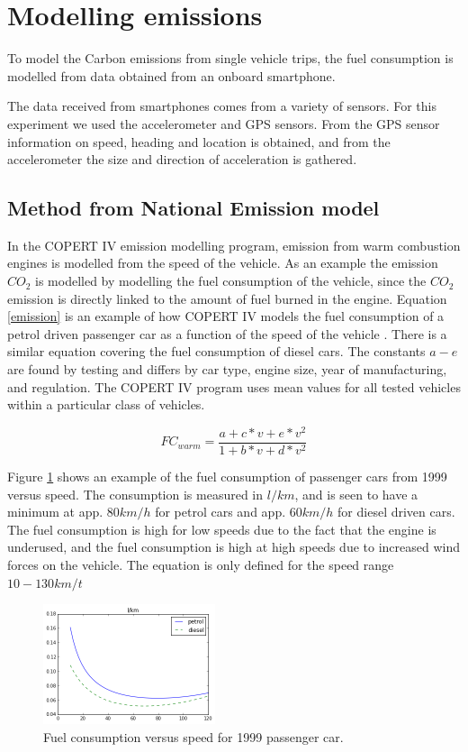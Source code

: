 \section{Modelling emissions}

To model the Carbon emissions from single vehicle trips, the fuel consumption is modelled from data obtained from an onboard smartphone.

The data received from smartphones comes from a variety of sensors. For this experiment we used the accelerometer and GPS sensors. From the GPS sensor information on speed, heading and location is obtained, and from the accelerometer the size and direction of acceleration is gathered.

\subsection{Method from National Emission model}

In the COPERT IV emission modelling program, emission from warm combustion engines is modelled from the speed of the vehicle. As an example the emission $CO_2$ is modelled by modelling the fuel consumption of the vehicle, since the $CO_2$ emission is directly linked to the amount of fuel burned in the engine. Equation \ref{emission} is an example of how COPERT IV models the fuel consumption of a petrol driven passenger car as a function of the speed of the vehicle \cite{Ntziachristos2012}. There is a similar equation covering the fuel consumption of diesel cars. The constants $a-e$ are found by testing and differs by car type, engine size, year of manufacturing, and regulation. The COPERT IV program uses mean values for all tested vehicles within a particular class of vehicles.

\begin{equation}
	FC_{warm} = \frac{a + c*v + e*v^2}{1 + b*v + d*v^2}
	\label{emission}
\end{equation}

Figure \ref{FC} shows an example of the fuel consumption of passenger cars from 1999 versus speed. The consumption is measured in $l/km$, and is seen to have a minimum at app. $80 km/h$ for petrol cars and app. $60 km/h$ for diesel driven cars. The fuel consumption is high for low speeds due to the fact that the engine is underused, and the fuel consumption is high at high speeds due to increased wind forces on the vehicle. The equation is only defined for the speed range $10 - 130 km/t$
 
\begin{figure}[h]
	\centering
  \includegraphics[width=0.45\textwidth]{fc_dieselpetrol}
  \caption{Fuel consumption versus speed for 1999 passenger car.}
  \label{FC}
\end{figure}

